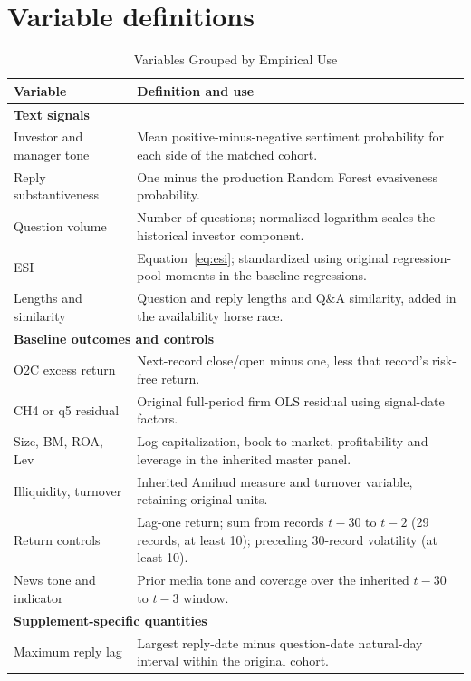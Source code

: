 \section{Variable definitions}\label{app:variable_definitions}
\begin{table}[H]\centering\footnotesize
\caption{Variables Grouped by Empirical Use}\label{tab:variables}
\renewcommand{\arraystretch}{1.15}
\begin{tabularx}{\textwidth}{@{}p{}X@{}}
\toprule Variable & Definition and use\\\midrule
\multicolumn{2}{l}{\textbf{Text signals}}\\
Investor and manager tone & Mean positive-minus-negative sentiment probability for each side of the matched cohort.\\
Reply substantiveness & One minus the production Random Forest evasiveness probability.\\
Question volume & Number of questions; normalized logarithm scales the historical investor component.\\
ESI & Equation~\eqref{eq:esi}; standardized using original regression-pool moments in the baseline regressions.\\
Lengths and similarity & Question and reply lengths and Q\&A similarity, added in the availability horse race.\\\midrule
\multicolumn{2}{l}{\textbf{Baseline outcomes and controls}}\\
O2C excess return & Next-record close/open minus one, less that record's risk-free return.\\
CH4 or q5 residual & Original full-period firm OLS residual using signal-date factors.\\
Size, BM, ROA, Lev & Log capitalization, book-to-market, profitability and leverage in the inherited master panel.\\
Illiquidity, turnover & Inherited Amihud measure and turnover variable, retaining original units.\\
Return controls & Lag-one return; sum from records $t-30$ to $t-2$ (29 records, at least 10); preceding 30-record volatility (at least 10).\\
News tone and indicator & Prior media tone and coverage over the inherited $t-30$ to $t-3$ window.\\\midrule
\multicolumn{2}{l}{\textbf{Supplement-specific quantities}}\\
Maximum reply lag & Largest reply-date minus question-date natural-day interval within the original cohort.\\

\end{tabularx}
\end{table}
